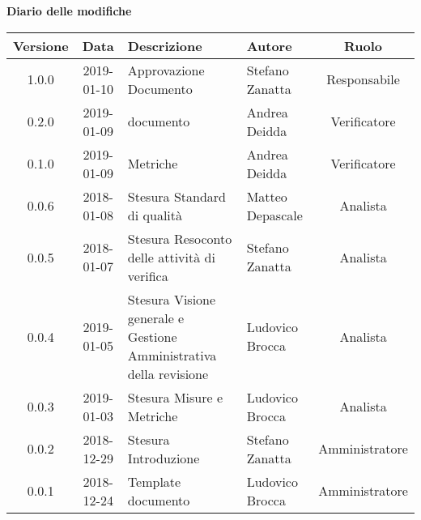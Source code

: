 	\begin{center}
		\textbf{Diario delle modifiche}
	\end{center}
	\begin{center}
		\begin{tabularx}{\textwidth}{|c|c|X|X|c|}
			\hline
			\textbf{Versione} & \textbf{Data} & \textbf{Descrizione} & \textbf{Autore} & \textbf{Ruolo} \\
			\hline
			1.0.0 & 2019-01-10 & Approvazione Documento& Stefano Zanatta & Responsabile\\
			\hline
			0.2.0 & 2019-01-09 & \glossario{Verifica} documento & Andrea Deidda & Verificatore\\
			\hline
			0.1.0 & 2019-01-09 & \glossario{Verifica} Metriche & Andrea Deidda & Verificatore\\
			\hline
			0.0.6 & 2018-01-08 & Stesura Standard di qualità & Matteo Depascale & Analista\\
			\hline
			0.0.5 & 2018-01-07 & Stesura Resoconto delle attività di verifica & Stefano Zanatta & Analista\\
			\hline
			0.0.4 & 2019-01-05 & Stesura Visione generale e Gestione Amministrativa della revisione  & Ludovico Brocca& Analista\\
			\hline	
			0.0.3 & 2019-01-03& Stesura Misure e Metriche &Ludovico Brocca & Analista\\
			\hline
			0.0.2 & 2018-12-29 & Stesura Introduzione& Stefano Zanatta & Amministratore\\
			\hline
			0.0.1 & 2018-12-24 & Template documento & Ludovico Brocca & Amministratore\\
			\hline
		\end{tabularx}
	\end{center}
\newpage